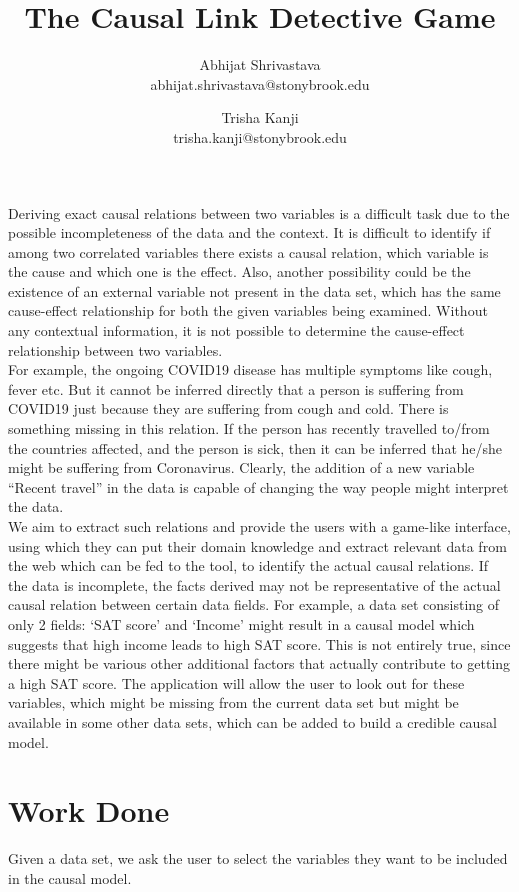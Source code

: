 \documentclass{vgtc}                          %
\title{The Causal Link Detective Game}
\author{Abhijat Shrivastava \\ %
        \scriptsize abhijat.shrivastava@stonybrook.edu %
\and Trisha Kanji\\ %
     \scriptsize trisha.kanji@stonybrook.edu }
\begin{document}

\maketitle

Deriving exact causal relations between two variables is a difficult task due to the possible incompleteness of the data and the context. It is difficult to identify if among two correlated variables there exists a causal relation, which variable is the cause and which one is the effect. Also, another possibility could be the existence of an external variable not present in the data set, which has the same cause-effect relationship for both the given variables being examined. Without any contextual information, it is not possible to determine the cause-effect relationship between two variables.
\\[1em]

For example, the ongoing COVID19 disease has multiple symptoms like cough, fever etc. But it cannot be inferred directly that a person is suffering from COVID19 just because they are suffering from cough and cold. There is something missing in this relation. If the person has recently travelled to/from the countries affected, and the person is sick, then it can be inferred that he/she might be suffering from Coronavirus. Clearly, the addition of a new variable “Recent travel” in the data is capable of changing the way people might interpret the data.
\\[1em]

We aim to extract such relations and provide the users with a game-like interface, using which they can put their domain knowledge and extract relevant data from the web which can be fed to the tool, to identify the actual causal relations. If the data is incomplete, the facts derived may not be representative of the actual causal relation between certain data fields. For example, a data set consisting of only 2 fields: ‘SAT score’ and ‘Income’ might result in a causal model which suggests that high income leads to high SAT score. This is not entirely true, since there might be various other additional factors that actually contribute to getting a high SAT score. The application will allow the user to look out for these variables, which might be missing from the current data set but might be available in some other data sets, which can be added to build a credible causal model. %

\section{Work Done}
Given a data set, we ask the user to select the variables they want to be included in the causal model. 
\end{document}
